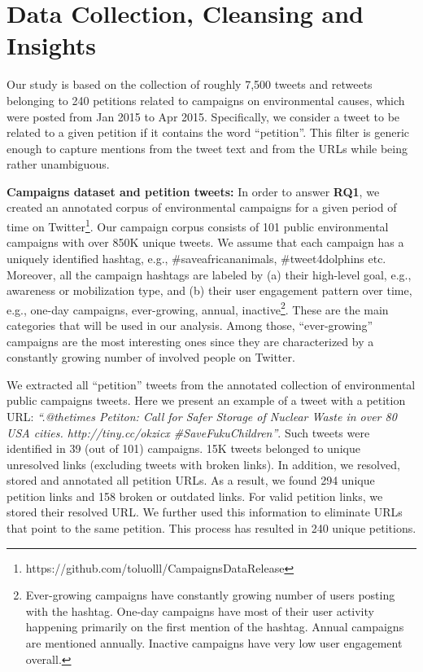 \section{Data Collection, Cleansing and Insights}
\label{sec:dataset}

Our study is based on the collection of roughly 7,500 tweets and retweets belonging to 240 petitions related to campaigns on environmental causes, which were posted from Jan 2015 to Apr 2015. Specifically, we consider a tweet to be related to a given petition if it contains the word ``petition''. This filter is generic enough to capture mentions from the tweet text and from the URLs while being rather unambiguous.

\textbf{Campaigns dataset and petition tweets:}
In order to answer \textbf{RQ1},
we created an annotated corpus of environmental campaigns for a given period of time on Twitter\footnote{https://github.com/toluolll/CampaignsDataRelease}.
Our campaign corpus consists of 101 public environmental campaigns with over 850K unique tweets. 
We assume that each campaign has a uniquely identified hashtag, e.g., \#saveafricananimals, \#tweet4dolphins etc.
Moreover, all the campaign hashtags are labeled by (a) their high-level goal, e.g., awareness or mobilization type, and (b) their user engagement pattern over time, e.g., one-day campaigns, ever-growing, annual, inactive\footnote{
Ever-growing campaigns have constantly growing number of users posting with the hashtag.
One-day campaigns have most of their user activity happening primarily on the first mention of the hashtag.
Annual campaigns are mentioned annually. Inactive campaigns have very low user engagement overall.}.
These are the main categories that will be used in our analysis.
Among those, ``ever-growing'' campaigns are the most interesting ones since they are characterized by a constantly growing number of involved people on Twitter.

We extracted all ``petition'' tweets from the annotated collection of environmental public campaigns tweets.
Here we present an example of a tweet with a petition URL: \textit{``.@thetimes Petiton: Call for Safer Storage of Nuclear Waste in over 80 USA cities. http://tiny.cc/okzicx  \#SaveFukuChildren''}.
Such tweets were identified in 39 (out of 101) campaigns. 15K tweets belonged to unique unresolved links (excluding tweets with broken links).
In addition, we resolved, stored and annotated all petition URLs. As a result, we found 294 unique petition links and 158 broken or outdated links.
For valid petition links, we stored their resolved URL. We further used this information to eliminate URLs that point to the same petition.
This process has resulted in 240 unique petitions.

